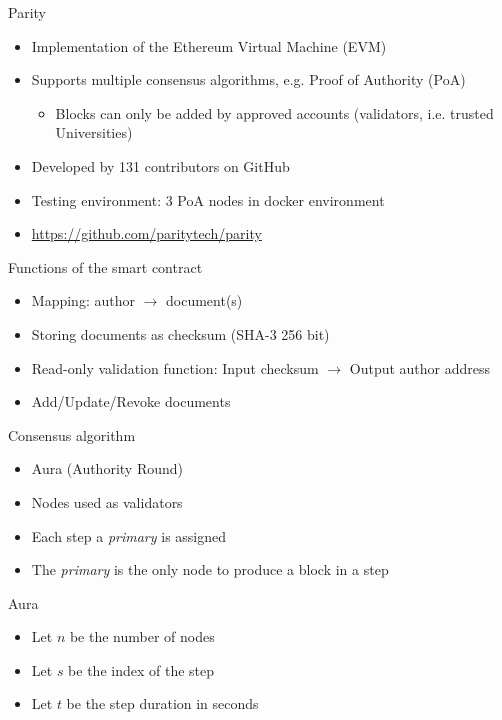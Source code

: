 \documentclass[10pt]{beamer}
\begin{document}
\begin{frame}{Parity}
	\begin{itemize}
		\item Implementation of the Ethereum Virtual Machine (EVM)
		\item Supports multiple consensus algorithms, e.g. Proof of Authority (PoA)
		\begin{itemize}
			\item Blocks can only be added by approved accounts (validators, i.e. trusted Universities)
		\end{itemize}
		\item Developed by 131 contributors on GitHub
		\item Testing environment: 3 PoA nodes in docker environment
		\item \url{https://github.com/paritytech/parity}
	\end{itemize}
\end{frame}

\begin{frame}{Functions of the smart contract}
	\begin{itemize}
		\item Mapping: author  $\rightarrow$ document(s)
		\item Storing documents as checksum (SHA-3 256 bit)
		\item Read-only validation function: Input checksum $\rightarrow$ Output author address
		\item Add/Update/Revoke documents
	\end{itemize}
\end{frame}

\begin{frame}{Consensus algorithm}
	\begin{itemize}
		\item Aura (Authority Round)
		\item Nodes used as validators
		\item Each step a \textit{primary} is assigned
		\item The \textit{primary} is the only node to produce a block in a step
	\end{itemize}
\end{frame}

\begin{frame}{Aura}
	\begin{itemize}
		\item Let $n$ be the number of nodes
		\item Let $s$ be the index of the step
		\item Let $t$ be the step duration in seconds
	\end{itemize}
\end{frame}
\end{document}

